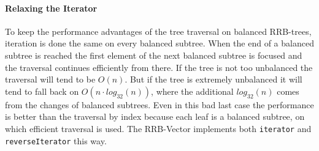 \paragraph{Relaxing the Iterator}
To keep the performance advantages of the tree traversal on balanced RRB-trees, iteration is done the same on every balanced subtree. When the end of a balanced subtree is reached the first element of the next balanced subtree is focused and the traversal continues efficiently from there. If the tree is not too unbalanced the traversal will tend to be $O(n)$. But if the tree is extremely unbalanced it will tend to fall back on $O(n \cdot log_{32}(n))$, where the additional $log_{32}(n)$ comes from the changes of balanced subtrees. Even in this bad last case the performance is better than the traversal by index because each leaf is a balanced subtree, on which efficient traversal is used. The RRB-Vector implements both \texttt{iterator} and \texttt{reverseIterator} this way.






